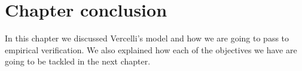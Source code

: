 \documentclass[a4paper, 12pt]{article}
\begin{document}
	\section{Chapter conclusion}
	In this chapter we discussed Vercelli's model and how we are going to pass to empirical verification. We also explained how each of the objectives we have are going to be tackled in the next chapter.	
	\newpage
	\singlespacing
		
	
\end{document}
